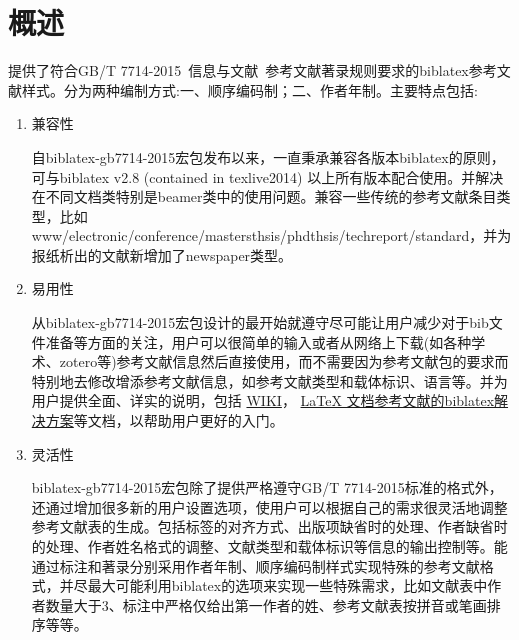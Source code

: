 
\titleandauthor
{}
\tableofcontents
{}
\listofegcode

\section{概述}
提供了符合GB/T 7714-2015~信息与文献~参考文献著录规则要求的biblatex参考文献样式。分为两种编制方式:一、顺序编码制；二、作者年制。主要特点包括:
\begin{enumerate}
  \item 兼容性

自biblatex-gb7714-2015宏包发布以来，一直秉承兼容各版本biblatex的原则，可与biblatex v2.8 (contained in texlive2014) 以上所有版本配合使用。并解决在不同文档类特别是beamer类中的使用问题。兼容一些传统的参考文献条目类型，比如www/electronic/conference/mastersthsis/phdthsis/techreport/standard，并为报纸析出的文献新增加了newspaper类型。

  \item 易用性

从biblatex-gb7714-2015宏包设计的最开始就遵守尽可能让用户减少对于bib文件准备等方面的关注，用户可以很简单的输入或者从网络上下载(如各种学术、zotero等)参考文献信息然后直接使用，而不需要因为参考文献包的要求而特别地去修改增添参考文献信息，如参考文献类型和载体标识、语言等。并为用户提供全面、详实的说明，包括
\href{https://github.com/hushidong/biblatex-gb7714-2015/wiki}{WIKI}，
\href{https://github.com/hushidong/biblatex-solution-to-latex-bibliography/blob/master/biblatex-solution-to-latex-bibliography.pdf}{LaTeX 文档参考文献的biblatex解决方案}等文档，以帮助用户更好的入门。

  \item 灵活性

biblatex-gb7714-2015宏包除了提供严格遵守GB/T 7714-2015标准的格式外，还通过增加很多新的用户设置选项，使用户可以根据自己的需求很灵活地调整参考文献表的生成。包括标签的对齐方式、出版项缺省时的处理、作者缺省时的处理、作者姓名格式的调整、文献类型和载体标识等信息的输出控制等。能通过标注和著录分别采用作者年制、顺序编码制样式实现特殊的参考文献格式，并尽最大可能利用biblatex的选项来实现一些特殊需求，比如文献表中作者数量大于3、标注中严格仅给出第一作者的姓、参考文献表按拼音或笔画排序等等。
\end{enumerate}

